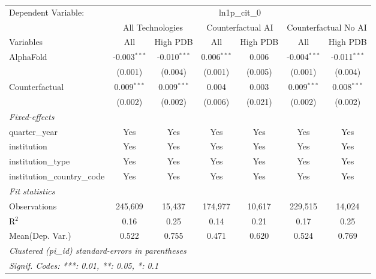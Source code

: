 \begingroup
\centering
\begin{tabular}{lcccccc}
   \tabularnewline \midrule \midrule
   Dependent Variable: & \multicolumn{6}{c}{ln1p\_cit\_0}\\
 & \multicolumn{2}{c}{All Technologies} & \multicolumn{2}{c}{Counterfactual AI} & \multicolumn{2}{c}{Counterfactual No AI} \\
\cmidrule(lr){1-1}\cmidrule(lr){2-3} \cmidrule(lr){4-5} \cmidrule(lr){6-7}
Variables & \multicolumn{1}{c}{All} & \multicolumn{1}{c}{High PDB} & \multicolumn{1}{c}{All} & \multicolumn{1}{c}{High PDB} & \multicolumn{1}{c}{All} & \multicolumn{1}{c}{High PDB} \\
\cmidrule(lr){1-1}\cmidrule(lr){2-2} \cmidrule(lr){3-3} \cmidrule(lr){4-4} \cmidrule(lr){5-5} \cmidrule(lr){6-6} \cmidrule(lr){7-7}
   AlphaFold                    & -0.003$^{***}$ & -0.010$^{***}$ & 0.006$^{***}$ & 0.006   & -0.004$^{***}$ & -0.011$^{***}$\\   
                                & (0.001)        & (0.004)        & (0.001)       & (0.005) & (0.001)        & (0.004)\\   
   Counterfactual               & 0.009$^{***}$  & 0.009$^{***}$  & 0.004         & 0.003   & 0.009$^{***}$  & 0.008$^{***}$\\   
                                & (0.002)        & (0.002)        & (0.006)       & (0.021) & (0.002)        & (0.002)\\   
   \midrule
   \emph{Fixed-effects}\\
   quarter\_year                & Yes            & Yes            & Yes           & Yes     & Yes            & Yes\\  
   institution                  & Yes            & Yes            & Yes           & Yes     & Yes            & Yes\\  
   institution\_type            & Yes            & Yes            & Yes           & Yes     & Yes            & Yes\\  
   institution\_country\_code   & Yes            & Yes            & Yes           & Yes     & Yes            & Yes\\  
   \midrule
   \emph{Fit statistics}\\
   Observations                 & 245,609        & 15,437         & 174,977       & 10,617  & 229,515        & 14,024\\  
   R$^2$                        & 0.16           & 0.25           & 0.14          & 0.21    & 0.17           & 0.25\\  
Mean(Dep. Var.) & 0.522 & 0.755 & 0.471 & 0.620 & 0.524 & 0.769 \\
   \midrule \midrule
   \multicolumn{7}{l}{\emph{Clustered (pi\_id) standard-errors in parentheses}}\\
   \multicolumn{7}{l}{\emph{Signif. Codes: ***: 0.01, **: 0.05, *: 0.1}}\\
\end{tabular}
\par\endgroup

